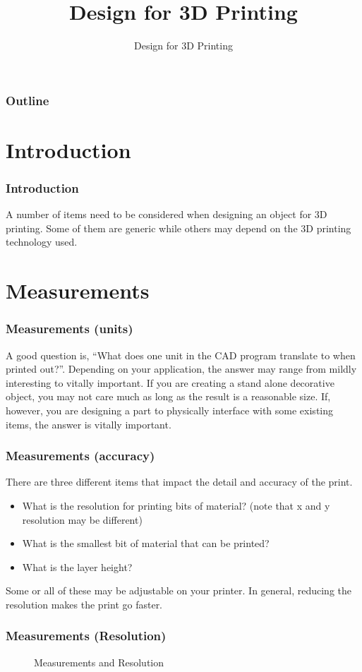 \documentclass[english,10pt]{beamer}
\title{Design for 3D Printing}
\subtitle{Design for 3D Printing}
\begin{document}
\begin{frame}
  \titlepage
\end{frame}

\begin{frame}
  \frametitle{Outline}
  \tableofcontents
\end{frame}

\section{Introduction}
\begin{frame}
  \frametitle{Introduction}
  A number of items need to be considered when designing an object for 3D printing.  Some of them are generic while others may depend on the 3D printing technology used.
\end{frame}

\section{Measurements}
\begin{frame}
  \frametitle{Measurements (units)}
  A good question is, ``What does one unit in the CAD program translate to when printed out?''.  Depending on your application, the answer may range from mildly interesting to vitally important.  If you are creating a stand alone decorative object, you may not care much as long as the result is a reasonable size.  If, however, you are designing a part to physically interface with some existing items, the answer is vitally important.
\end{frame}

\begin{frame}
  \frametitle{Measurements (accuracy)}
  There are three different items that impact the detail and accuracy of the print.
  \begin{itemize}
    \item What is the resolution for printing bits of material? (note that x and y resolution may be different)
    \item What is the smallest bit of material that can be printed?
    \item What is the layer height?
  \end{itemize}
  Some or all of these may be adjustable on your printer.  In general, reducing the resolution makes the print go faster.
\end{frame}

\begin{frame}
  \frametitle{Measurements (Resolution)}
  \begin{figure}
    
    \caption{Measurements and Resolution}
  \end{figure}
\end{frame}
\end{document}
